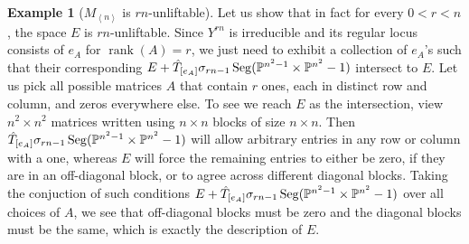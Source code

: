 \documentclass[a4paper,10pt]{article}
\def\gener#1{\left\langle#1\right\rangle}
\DeclareMathOperator{\rank}{rank}\let\rk\rank
\DeclareMathOperator{\Seg}{Seg}
\theoremstyle{definition}
\newtheorem{example}[theorem]{Example}
\theoremstyle{remark}
\begin{document}
\begin{example}[$M_{\gener n}$ is $rn$-unliftable]
    Let us show that in fact for every $0<r<n$, the space $E$ is $rn$-unliftable. Since $Y^{rn}$ is irreducible and its regular locus consists of $e_A$ for $\rank(A)=r$, we just need to exhibit a collection of $e_A$'s such that their corresponding $E+\hat T_{[e_A]}\sigma_{rn-1}\Seg(\pe^{n^2-1}\times\pe^{n^2}-1)$ intersect to $E$. Let us pick all possible matrices $A$ that contain $r$ ones, each in distinct row and column, and zeros everywhere else. To see we reach $E$ as the intersection, view $n^2\times n^2$ matrices written using $n\times n$ blocks of size $n\times n$.
    Then $\hat T_{[e_A]}\sigma_{rn-1}\Seg(\pe^{n^2-1}\times\pe^{n^2}-1)$ will allow arbitrary entries in any row or column with a one, whereas $E$ will force the remaining entries to either be zero, if they are in an off-diagonal block, or to agree across different diagonal blocks. Taking the conjuction of such conditions $E+\hat T_{[e_A]}\sigma_{rn-1}\Seg(\pe^{n^2-1}\times\pe^{n^2}-1)$ over all choices of $A$, we see that off-diagonal blocks must be zero and the diagonal blocks must be the same, which is exactly the description of $E$.


\end{example}
\end{document}
